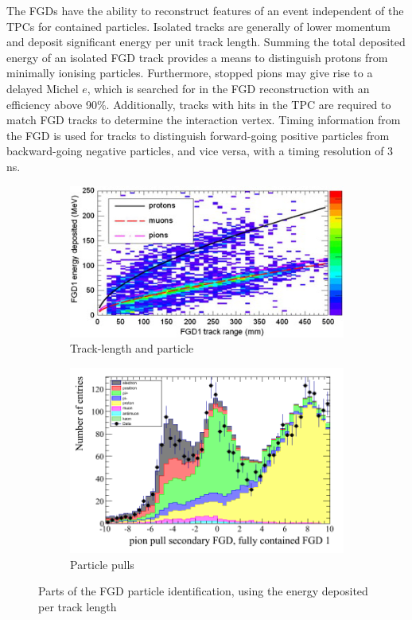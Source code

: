 The FGDs have the ability to reconstruct features of an event independent of the TPCs for contained particles. Isolated tracks are generally of lower momentum and deposit significant energy per unit track length. Summing the total deposited energy of an isolated FGD track provides a means to distinguish protons from minimally ionising particles. Furthermore, stopped pions may give rise to a delayed Michel $e$, which is searched for in the FGD reconstruction with an efficiency above 90\%\cite{thesis_christine}. Additionally, tracks with hits in the TPC are required to match FGD tracks to determine the interaction vertex. Timing information from the FGD is used for tracks to distinguish forward-going positive particles from backward-going negative particles, and vice versa, with a timing resolution of 3 ns.
\begin{figure}[h]
	\begin{subfigure}[t]{0.47\textwidth}
		\includegraphics[width=\textwidth, trim={0mm 0mm 0mm 0mm}, clip,page=1]{figures/det_chap/fgd/fgd_byrange}
		\caption{Track-length and particle}
	\end{subfigure}
	\begin{subfigure}[t]{0.47\textwidth}
		\includegraphics[width=\textwidth, trim={0mm 0mm 0mm 0mm}, clip,page=1]{figures/numu/Cuts/pull_secondarytrack_FGD_all_fullycontained}
		\caption{Particle pulls}
	\end{subfigure}	
	\caption{Parts of the FGD particle identification, using the energy deposited per track length}
	\label{fig:fgd_reco}
\end{figure}

